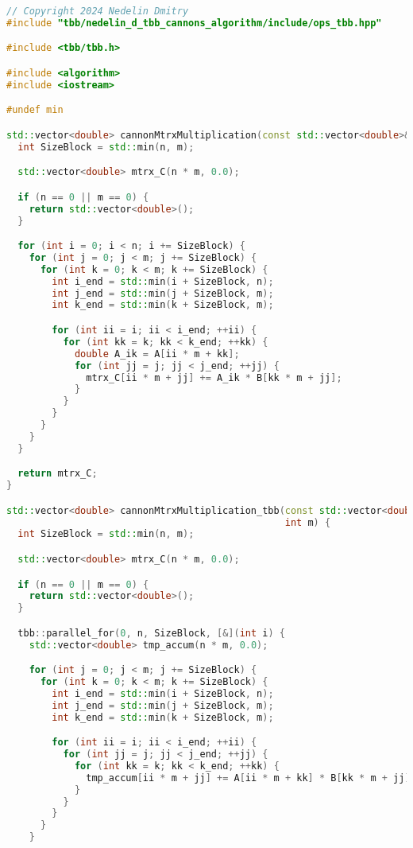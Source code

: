 \documentclass{report}
\begin{document}
\begin{lstlisting}[language=C++,caption=TBB версия]
// Copyright 2024 Nedelin Dmitry
#include "tbb/nedelin_d_tbb_cannons_algorithm/include/ops_tbb.hpp"

#include <tbb/tbb.h>

#include <algorithm>
#include <iostream>

#undef min

std::vector<double> cannonMtrxMultiplication(const std::vector<double>& A, const std::vector<double>& B, int n, int m) {
  int SizeBlock = std::min(n, m);

  std::vector<double> mtrx_C(n * m, 0.0);

  if (n == 0 || m == 0) {
    return std::vector<double>();
  }

  for (int i = 0; i < n; i += SizeBlock) {
    for (int j = 0; j < m; j += SizeBlock) {
      for (int k = 0; k < m; k += SizeBlock) {
        int i_end = std::min(i + SizeBlock, n);
        int j_end = std::min(j + SizeBlock, m);
        int k_end = std::min(k + SizeBlock, m);

        for (int ii = i; ii < i_end; ++ii) {
          for (int kk = k; kk < k_end; ++kk) {
            double A_ik = A[ii * m + kk];
            for (int jj = j; jj < j_end; ++jj) {
              mtrx_C[ii * m + jj] += A_ik * B[kk * m + jj];
            }
          }
        }
      }
    }
  }

  return mtrx_C;
}

std::vector<double> cannonMtrxMultiplication_tbb(const std::vector<double>& A, const std::vector<double>& B, int n,
                                                 int m) {
  int SizeBlock = std::min(n, m);

  std::vector<double> mtrx_C(n * m, 0.0);

  if (n == 0 || m == 0) {
    return std::vector<double>();
  }

  tbb::parallel_for(0, n, SizeBlock, [&](int i) {
    std::vector<double> tmp_accum(n * m, 0.0);

    for (int j = 0; j < m; j += SizeBlock) {
      for (int k = 0; k < m; k += SizeBlock) {
        int i_end = std::min(i + SizeBlock, n);
        int j_end = std::min(j + SizeBlock, m);
        int k_end = std::min(k + SizeBlock, m);

        for (int ii = i; ii < i_end; ++ii) {
          for (int jj = j; jj < j_end; ++jj) {
            for (int kk = k; kk < k_end; ++kk) {
              tmp_accum[ii * m + jj] += A[ii * m + kk] * B[kk * m + jj];
            }
          }
        }
      }
    }


\end{lstlisting}
\end{document}
